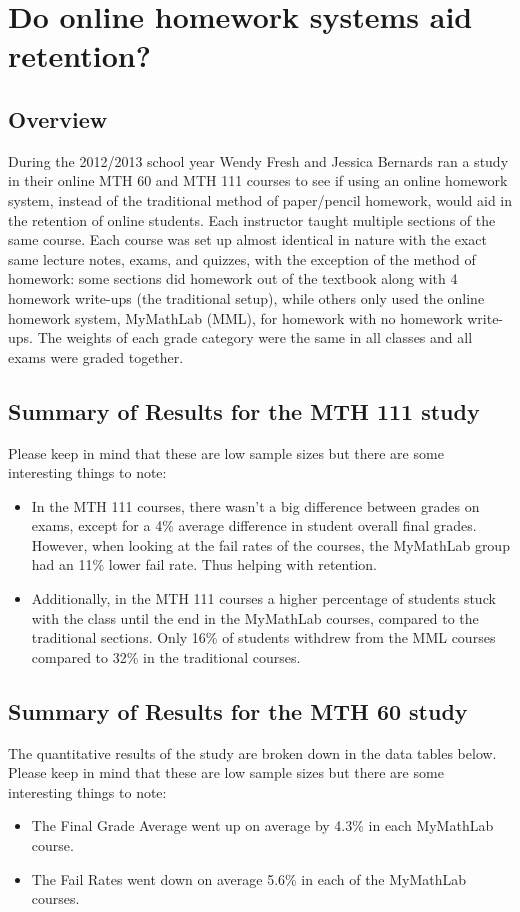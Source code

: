 \chapter{Do online homework systems aid retention?}
\label{app:sec:onlinehwstudy}

\section{Overview}
During the 2012/2013 school year Wendy Fresh and Jessica Bernards ran a study in their online MTH 60 and MTH 111 courses to see if using an online homework system, instead of the traditional method of paper/pencil homework, would aid in the retention of online students.  Each instructor taught multiple sections of the same course.  Each course was set up almost identical in nature with the exact same lecture notes, exams, and quizzes, with the exception of the method of homework: some sections did homework out of the textbook along with 4 homework write-ups (the traditional setup), while others only used the online homework system, MyMathLab (MML), for homework with no homework write-ups.  The weights of each grade category were the same in all classes and all exams were graded together.

\section{Summary of Results for the MTH 111 study}
Please keep in mind that these are low sample sizes but there are some interesting things to note: 
\begin{itemize}
  \item In the MTH 111 courses, there wasn’t a big difference between grades on exams, except for a 4\% average difference in student overall final grades.  However, when looking at the fail rates of the courses, the MyMathLab group had an 11\% lower fail rate.  Thus helping with retention.
  \item Additionally, in the MTH 111 courses a higher percentage of students stuck with the class until the end in the MyMathLab courses, compared to the traditional sections.  Only 16\% of students withdrew from the MML courses compared to 32\% in the traditional courses.  
\end{itemize}

\section{Summary of Results for the MTH 60 study}
The quantitative results of the study are broken down in the data tables below.  Please keep in mind that these are low sample sizes but there are some interesting things to note: 
\begin{itemize}
  \item The Final Grade Average went up on average by 4.3\% in each MyMathLab course. 
  \item The Fail Rates went down on average 5.6\% in each of the MyMathLab courses.
\end{itemize}


